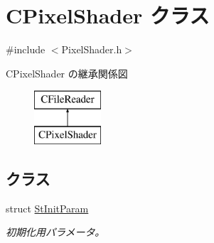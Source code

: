 \hypertarget{class_c_pixel_shader}{}\section{C\+Pixel\+Shader クラス}
\label{class_c_pixel_shader}


{\ttfamily \#include $<$Pixel\+Shader.\+h$>$}

C\+Pixel\+Shader の継承関係図\begin{figure}[H]
\begin{center}
\leavevmode
\includegraphics[height=2.000000cm]{class_c_pixel_shader}
\end{center}
\end{figure}
\subsection*{クラス}
\begin{DoxyCompactItemize}
\item 
struct \hyperlink{struct_c_pixel_shader_1_1_st_init_param}{St\+Init\+Param}
\begin{DoxyCompactList}\small\item\em 初期化用パラメータ。 \end{DoxyCompactList}\end{DoxyCompactItemize}
